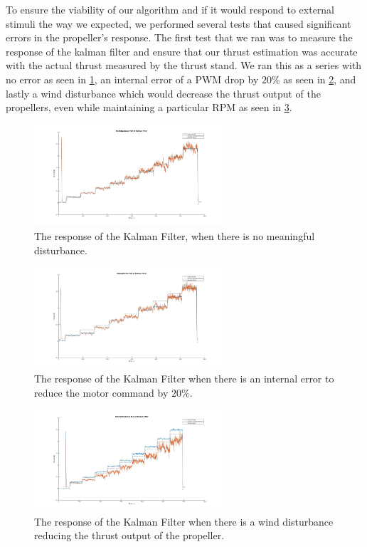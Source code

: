 \documentclass[conference]{IEEEtran}
\begin{document}
To ensure the viability of our algorithm and if it would respond to external stimuli the way we expected, we performed several tests that caused significant errors in the propeller's response. The first test that we ran was to measure the response of the kalman filter and ensure that our thrust estimation was accurate with the actual thrust measured by the thrust stand. We ran this as a series with no error as seen in \ref{kalman}, an internal error of a PWM drop by $20\%$ as seen in \ref{pwm_reduc}, and lastly a wind disturbance which would decrease the thrust output of the propellers, even while maintaining a particular RPM as seen in \ref{wind_d}.
\begin{figure}[htbp]
	\includegraphics[width=7cm]{images/Figure_2/kalman.jpg}
	\caption{The response of the Kalman Filter, when there is no meaningful disturbance.}
	\label{kalman}
\end{figure}
\begin{figure}[htbp]
	\includegraphics[width=7cm]{images/Figure_2/pwm_reduc.jpg}
	\caption{The response of the Kalman Filter when there is an internal error to reduce the motor command by $20\%$.}
	\label{pwm_reduc}
\end{figure}
\begin{figure}[htbp]
	\includegraphics[width=7cm]{images/Figure_2/wind_d.jpg}
	\caption{The response of the Kalman Filter when there is a wind disturbance reducing the thrust output of the propeller.}
	\label{wind_d}
\end{figure}
\end{document}
